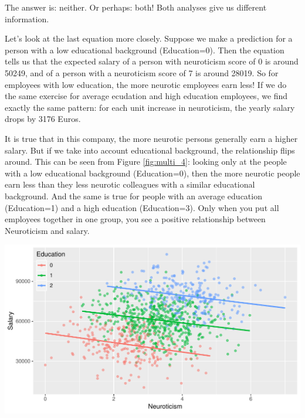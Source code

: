 \documentclass[]{report}\usepackage[]{graphicx}\usepackage[]{color}
\makeatletter
\def\maxwidth{ %
  \ifdim\Gin@nat@width>\linewidth
    \linewidth
  \else
    \Gin@nat@width
  \fi
}
\newenvironment{knitrout}{}{} %
\makeatother
\begin{document}
The answer is: neither. Or perhaps: both! Both analyses give us different information.

Let's look at the last equation more closely. Suppose we make a prediction for a person with a low educational background (Education=0). Then the equation tells us that the expected salary of a person with neuroticism score of 0 is around 50249, and of a person with a neuroticism score of 7 is around 28019. So for employees with low education, the more neurotic employees earn less! If we do the same exercise for average ecudation and high education employees, we find exactly the same pattern: for each unit increase in neuroticism, the yearly salary drops by 3176 Euros.


It is true that in this company, the more neurotic persons generally earn a higher salary. But if we take into account educational background, the relationship flips around. This can be seen from Figure \ref{fig:multi_4}: looking only at the people with a low educational background (Education=0), then the more neurotic people earn less than they less neurotic colleagues with a similar educational background. And the same is true for people with an average education (Education=1) and a high education (Education=3). Only when you put all employees together in one group, you see a positive relationship between Neuroticism and salary.


\begin{knitrout}
\color{fgcolor}

{\centering \includegraphics[width=\maxwidth]{figure/multi_5-1} 

}



\end{knitrout}
\end{document}
